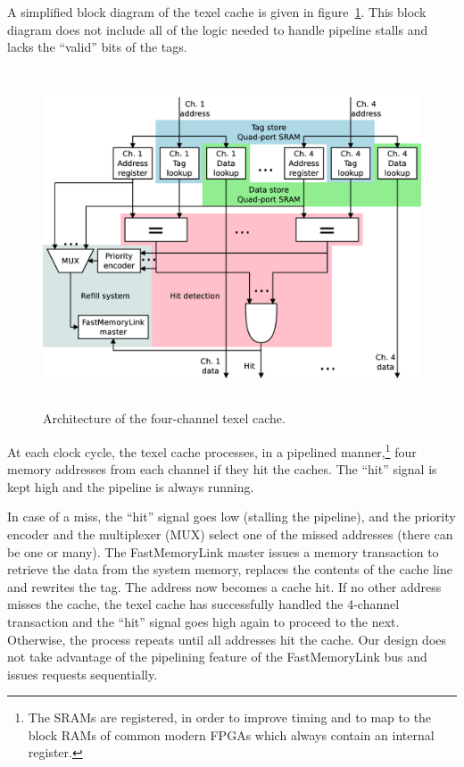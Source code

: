 \documentclass[a4paper,11pt]{kthesis}
\begin{document}
A simplified block diagram of the texel cache is given in figure~\ref{fig:tcarch}. This block diagram does not include all of the logic needed to handle pipeline stalls and lacks the ``valid'' bits of the tags.

\begin{figure}[htp]
\centering
\includegraphics[height=100mm]{tcarch.eps}
\caption{Architecture of the four-channel texel cache.}
\label{fig:tcarch}
\end{figure}

At each clock cycle, the texel cache processes, in a pipelined manner,\footnote{The SRAMs are registered, in order to improve timing and to map to the block RAMs of common modern FPGAs which always contain an internal register.} four memory addresses from each channel if they hit the caches. The ``hit'' signal is kept high and the pipeline is always running.

In case of a miss, the ``hit'' signal goes low (stalling the pipeline), and the priority encoder and the multiplexer (MUX) select one of the missed addresses (there can be one or many). The FastMemoryLink master issues a memory transaction to retrieve the data from the system memory, replaces the contents of the cache line and rewrites the tag. The address now becomes a cache hit. If no other address misses the cache, the texel cache has successfully handled the 4-channel transaction and the ``hit'' signal goes high again to proceed to the next. Otherwise, the process repeats until all addresses hit the cache. Our design does not take advantage of the pipelining feature of the FastMemoryLink bus and issues requests sequentially.
\end{document}
